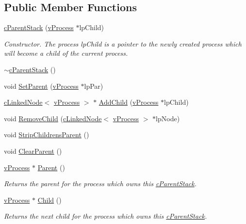 \subsection*{Public Member Functions}
\begin{DoxyCompactItemize}
\item 
\hyperlink{classc_parent_stack_a6ccf0d26a7114d1b781ea312a7ef816e}{cParentStack} (\hyperlink{classv_process}{vProcess} $\ast$lpChild)
\begin{DoxyCompactList}\small\item\em Constructor. The process lpChild is a pointer to the newly created process which will become a child of the current process. \item\end{DoxyCompactList}\item 
\hyperlink{classc_parent_stack_acc3d347f4a67eb04bc6a2842d5e16e1a}{$\sim$cParentStack} ()
\item 
void \hyperlink{classc_parent_stack_a21bfaa81d2990a2d34d799559a4a4858}{SetParent} (\hyperlink{classv_process}{vProcess} $\ast$lpPar)
\item 
\hyperlink{classc_linked_node}{cLinkedNode}$<$ \hyperlink{classv_process}{vProcess} $>$ $\ast$ \hyperlink{classc_parent_stack_a923b5db7907ff0e750453787afaea510}{AddChild} (\hyperlink{classv_process}{vProcess} $\ast$lpChild)
\item 
void \hyperlink{classc_parent_stack_ac89cee3726fa9e9af0daee8c0cc6d991}{RemoveChild} (\hyperlink{classc_linked_node}{cLinkedNode}$<$ \hyperlink{classv_process}{vProcess} $>$ $\ast$lpNode)
\item 
void \hyperlink{classc_parent_stack_a82cd7f66aeb7d133bddf5a9712a6e0dd}{StripChildrensParent} ()
\item 
void \hyperlink{classc_parent_stack_a9f438f0cfefaed2723befc967e451216}{ClearParent} ()
\item 
\hyperlink{classv_process}{vProcess} $\ast$ \hyperlink{classc_parent_stack_add2b9e9bfdf5a6f3f98a8c90bfc74e70}{Parent} ()
\begin{DoxyCompactList}\small\item\em Returns the parent for the process which owns this \hyperlink{classc_parent_stack}{cParentStack}. \item\end{DoxyCompactList}\item 
\hyperlink{classv_process}{vProcess} $\ast$ \hyperlink{classc_parent_stack_a30858482051f9ec6201596e680f49311}{Child} ()
\begin{DoxyCompactList}\small\item\em Returns the next child for the process which owns this \hyperlink{classc_parent_stack}{cParentStack}. \item\end{DoxyCompactList}\item 

\end{DoxyCompactItemize}
